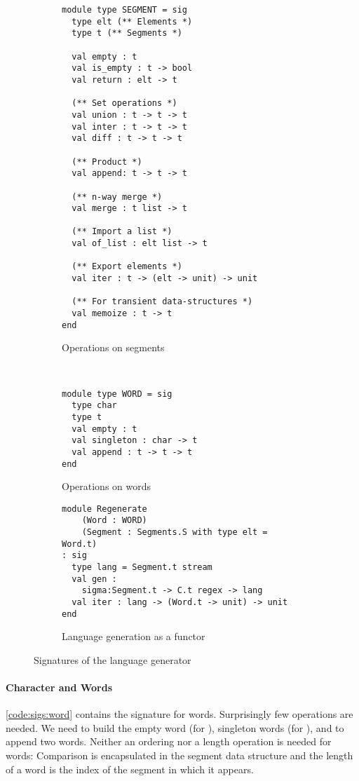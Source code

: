 \begin{figure}[tp]
  \centering
  \begin{subfigure}{0.44\linewidth}
\begin{lstlisting}[basicstyle=\scriptsize\ttfamily]
module type SEGMENT = sig
  type elt (** Elements *)
  type t (** Segments *)

  val empty : t
  val is_empty : t -> bool
  val return : elt -> t

  (** Set operations *)
  val union : t -> t -> t
  val inter : t -> t -> t
  val diff : t -> t -> t

  (** Product *)
  val append: t -> t -> t

  (** n-way merge *)
  val merge : t list -> t

  (** Import a list *)
  val of_list : elt list -> t

  (** Export elements *)
  val iter : t -> (elt -> unit) -> unit

  (** For transient data-structures *)
  val memoize : t -> t
end
\end{lstlisting}
    \caption{Operations on segments}
    \label{code:sigs:segment}
  \end{subfigure}~
  \begin{subfigure}{0.57\linewidth}
\begin{lstlisting}[basicstyle=\scriptsize\ttfamily]
module type WORD = sig
  type char
  type t
  val empty : t
  val singleton : char -> t
  val append : t -> t -> t
end
\end{lstlisting}
    \caption{Operations on words}
    \label{code:sigs:word}
\begin{lstlisting}[basicstyle=\scriptsize\ttfamily]
module Regenerate
    (Word : WORD)
    (Segment : Segments.S with type elt = Word.t)
: sig
  type lang = Segment.t stream
  val gen : 
    sigma:Segment.t -> C.t regex -> lang
  val iter : lang -> (Word.t -> unit) -> unit
end
\end{lstlisting}
    \caption{Language generation as a functor}
    \label{code:sigs:regen}
  \end{subfigure}
  \caption{Signatures of the language generator}
  \label{code:sigs}
\end{figure}

\paragraph{Character and Words}

\autoref{code:sigs:word} contains the signature for words.
Surprisingly few operations are needed. We need to build the empty word (for ),
singleton words (for ), and to append two words.
Neither an ordering nor a length operation is needed for words:
Comparison is encapsulated in the segment
data structure and the length of a word is the index of the segment in
which it appears.

